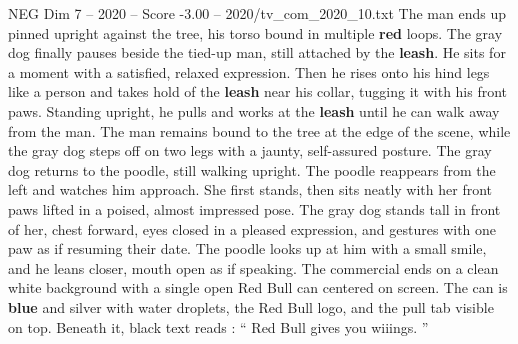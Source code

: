 \begin{textsample}{NEG Dim 7 – 2020 – Score -3.00 – 2020/tv\_com\_2020\_10.txt}
The man ends up pinned upright against the tree, his torso bound in multiple \textbf{red} loops.
The gray dog finally pauses beside the tied-up man, still attached by the \textbf{leash}.
He sits for a moment with a satisfied, relaxed expression.
Then he rises onto his hind legs like a person and takes hold of the \textbf{leash} near his collar, tugging it with his front paws.
Standing upright, he pulls and works at the \textbf{leash} until he can walk away from the man.
The man remains bound to the tree at the edge of the scene, while the gray dog steps off on two legs with a jaunty, self-assured posture.
The gray dog returns to the poodle, still walking upright.
The poodle reappears from the left and watches him approach.
She first stands, then sits neatly with her front paws lifted in a poised, almost impressed pose.
The gray dog stands tall in front of her, chest forward, eyes closed in a pleased expression, and gestures with one paw as if resuming their date.
The poodle looks up at him with a small smile, and he leans closer, mouth open as if speaking.
The commercial ends on a clean white background with a single open Red Bull can centered on screen.
The can is \textbf{blue} and silver with water droplets, the Red Bull logo, and the pull tab visible on top.
Beneath it, black text reads : “ Red Bull gives you wiiings. ”

\end{textsample}

